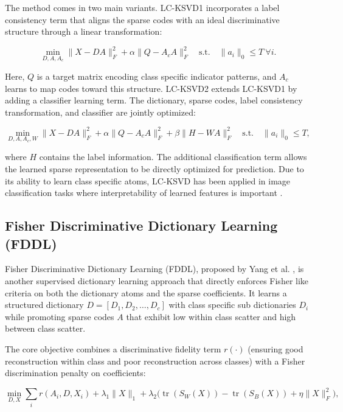 The method comes in two main variants. LC-KSVD1 incorporates a label consistency 
term that aligns the sparse codes with an ideal discriminative structure through 
a linear transformation:

\begin{equation}[LC-KSVD1 Objective]
\min_{D, A, A_c} \|X - D A\|_F^2 + \alpha \|Q - A_c A\|_F^2 \quad \text{s.t.} \quad \|a_i\|_0 \leq T \ \forall i.
\end{equation}

Here, \(Q\) is a target matrix encoding class specific indicator patterns, and 
\(A_c\) learns to map codes toward this structure. LC-KSVD2 extends LC-KSVD1 by 
adding a classifier learning term. The dictionary, sparse codes, label consistency 
transformation, and classifier are jointly optimized:

\begin{equation}[LC-KSVD2 Objective]
\min_{D, A, A_c, W} \|X - D A\|_F^2 + \alpha \|Q - A_c A\|_F^2 + \beta \|H - W A\|_F^2 \quad \text{s.t.} \quad \|a_i\|_0 \leq T,
\end{equation}

where \(H\) contains the label information. The additional classification term 
allows the learned sparse representation to be directly optimized for prediction. 
Due to its ability to learn class specific atoms, LC-KSVD has been applied in 
image classification tasks where interpretability of learned features is important 
\cite{jiang2013lcksvd}.

\subsection{Fisher Discriminative Dictionary Learning (FDDL)}
\label{sec:lit-fddl}

Fisher Discriminative Dictionary Learning (FDDL), proposed by Yang et al. \cite{yang2011fddl}, 
is another supervised dictionary learning approach that directly enforces 
Fisher like criteria on both the dictionary atoms and the sparse coefficients. 
It learns a structured dictionary \(D = [D_1, D_2, \dots, D_c]\) with class specific 
sub dictionaries \(D_i\) while promoting sparse codes \(A\) that exhibit low 
within class scatter and high between class scatter.

The core objective combines a discriminative fidelity term \(r(\cdot)\) 
(ensuring good reconstruction within class and poor reconstruction across classes) 
with a Fisher discrimination penalty on coefficients:

\begin{equation}[FDDL Objective]
\min_{D, X} \sum_i r(A_i, D, X_i) + \lambda_1 \|X\|_1 + \lambda_2 \Big( \operatorname{tr}(S_W(X)) - \operatorname{tr}(S_B(X)) + \eta \|X\|_F^2 \Big),
\end{equation}

